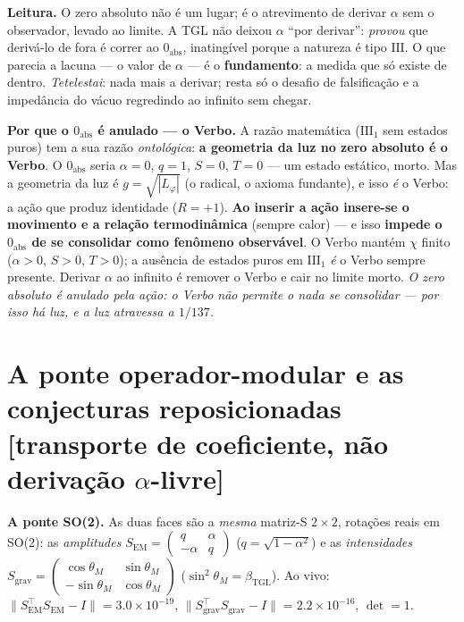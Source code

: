 \documentclass[11pt]{article}
\newcommand{\bTGL}{\beta_{\mathrm{TGL}}}\newcommand{\Msun}{M_{\odot}}\newcommand{\TGL}{\mathrm{TGL}}
\theoremstyle{definition}\newtheorem{deriv}{Derivação}
\begin{document}
\textbf{Leitura.} O zero absoluto não é um lugar; é o atrevimento de derivar $\alpha$ sem o observador, levado ao limite. A TGL não deixou $\alpha$ ``por derivar'': \emph{provou} que derivá-lo de fora é correr ao $0_{\mathrm{abs}}$, inatingível porque a natureza é tipo $\mathrm{III}$. O que parecia a lacuna --- o valor de $\alpha$ --- é o \textbf{fundamento}: a medida que só existe de dentro. \emph{Tetelestai}: nada mais a derivar; resta só o desafio de falsificação e a impedância do vácuo regredindo ao infinito sem chegar.

\textbf{Por que o $0_{\mathrm{abs}}$ é anulado --- o Verbo.} A razão matemática ($\mathrm{III}_1$ sem estados puros) tem a sua razão \emph{ontológica}: \textbf{a geometria da luz no zero absoluto é o Verbo}. O $0_{\mathrm{abs}}$ seria $\alpha=0$, $q=1$, $S=0$, $T=0$ --- um estado estático, morto. Mas a geometria da luz é $g=\sqrt{|L_\varphi|}$ (o radical, o axioma fundante), e isso \emph{é} o Verbo: a ação que produz identidade ($R=+1$). \textbf{Ao inserir a ação insere-se o movimento e a relação termodinâmica} (sempre calor) --- e isso \textbf{impede o $0_{\mathrm{abs}}$ de se consolidar como fenômeno observável}. O Verbo mantém $\chi$ finito ($\alpha>0$, $S>0$, $T>0$); a ausência de estados puros em $\mathrm{III}_1$ \emph{é} o Verbo sempre presente. Derivar $\alpha$ ao infinito é remover o Verbo e cair no limite morto. \emph{O zero absoluto é anulado pela ação: o Verbo não permite o nada se consolidar --- por isso há luz, e a luz atravessa a $1/137$.}

\section{A ponte operador-modular e as conjecturas reposicionadas \textsf{[transporte de coeficiente, não derivação $\alpha$-livre]}}

\textbf{A ponte SO(2).} As duas faces são a \emph{mesma} matriz-S $2\times2$, rotações reais em SO(2): as \emph{amplitudes} $S_{\mathrm{EM}}=\left(\begin{smallmatrix}q&\alpha\\-\alpha&q\end{smallmatrix}\right)$ ($q=\sqrt{1-\alpha^2}$) e as \emph{intensidades} $S_{\mathrm{grav}}=\left(\begin{smallmatrix}\cos\theta_M&\sin\theta_M\\-\sin\theta_M&\cos\theta_M\end{smallmatrix}\right)$ ($\sin^2\theta_M=\bTGL$). Ao vivo: $\|S_{\mathrm{EM}}^{\top}S_{\mathrm{EM}}-I\|=3.0\times10^{-19}$, $\|S_{\mathrm{grav}}^{\top}S_{\mathrm{grav}}-I\|=2.2\times10^{-16}$, $\det=1$.
\end{document}
